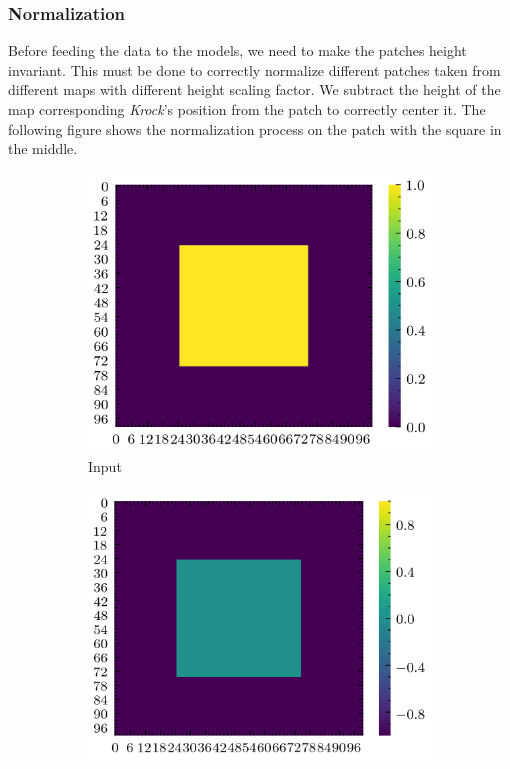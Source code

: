 \documentclass[../document.tex]{subfiles}
\begin{document}
\subsubsection{Normalization}
Before feeding the data to the models, we need to make the patches height invariant. This must be done to correctly normalize different patches taken from different maps with different height scaling factor. We subtract the height of the map corresponding \emph{Krock}'s position from the patch to correctly center it. The following figure shows the normalization process on the patch with the square in the middle.
\begin{figure}[H]
    \centering
    \begin{subfigure}[b]{0.32\textwidth}
        \includegraphics[width=\textwidth]{../img/data-aug/2d/square-middle.png}
        \caption{Input}
    \end{subfigure}
    \begin{subfigure}[b]{0.32\textwidth}
        \includegraphics[width=\textwidth]{../img/data-aug/2d/square-middle-center.png}

\end{subfigure}
\end{figure}
\end{document}
